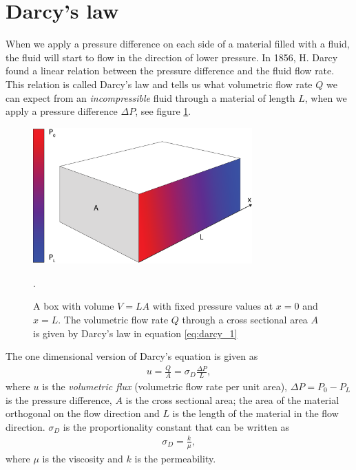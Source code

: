 \section{Darcy's law}
\label{sec:darcy_law}
When we apply a pressure difference on each side of a material filled with a fluid, the fluid will start to flow in the direction of lower pressure. In 1856, H. Darcy found a linear relation between the pressure difference and the fluid flow rate. This relation is called Darcy's law and tells us what volumetric flow rate $Q$ we can expect from an \textit{incompressible} fluid through a material of length $L$, when we apply a pressure difference $\Delta P$, see figure \ref{fig:darcys_law}. 
\begin{figure}[h!]
\begin{center}
\includegraphics[width=0.75\textwidth, trim=0cm 0cm 0cm 0cm, clip]{kinetic_theory/figures/darcy.eps}
\end{center}
\caption{A box with volume $V=LA$ with fixed pressure values at $x=0$ and $x=L$. The volumetric flow rate $Q$ through a cross sectional area $A$ is given by Darcy's law in equation \eqref{eq:darcy_1}}.
\label{fig:darcys_law}
\end{figure}
The one dimensional version of Darcy's equation is given as 
\begin{align}
\label{eq:darcy_1}
	u = \frac{Q}{A} = \sigma_D\frac{\Delta P}{ L},
\end{align}
where $u$ is the \textit{volumetric flux} (volumetric flow rate per unit area), $\Delta P = P_0 - P_L$ is the pressure difference, $A$ is the cross sectional area; the area of the material orthogonal on the flow direction and $L$ is the length of the material in the flow direction. $\sigma_D$ is the proportionality constant that can be written as
\begin{align}
	\sigma_D = \frac{k}{\mu},
\end{align}
where $\mu$ is the viscosity and $k$ is the permeability.
